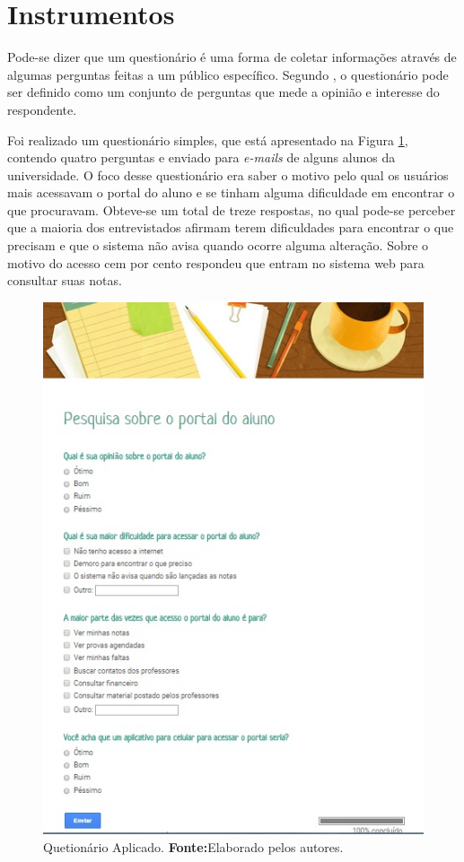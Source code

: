 \section{Instrumentos}

	\par Pode-se dizer que um questionário é uma forma de coletar informações
através de algumas perguntas feitas a um público específico. Segundo
, o questionário pode ser definido como um conjunto
de perguntas que mede a opinião e interesse do respondente.

	\par Foi realizado um questionário simples, que está apresentado na Figura
\ref{fig:qm1}, contendo quatro perguntas e enviado para \textit{e-mails} de
alguns alunos da universidade. O foco desse questionário era saber o motivo pelo qual
os usuários mais acessavam o portal do aluno e se tinham alguma dificuldade em
encontrar o que procuravam. Obteve-se um total de treze respostas, no qual
pode-se perceber que a maioria dos entrevistados afirmam terem dificuldades
para encontrar o que precisam e que o sistema não avisa quando ocorre alguma
alteração. Sobre o motivo do acesso cem por cento respondeu que entram no
sistema web para consultar suas notas.
\pagebreak
\begin{figure}[h!]
	\centerline{\includegraphics[scale=0.5]{./imagens/2_q_metodologico/qm1.png}}
	\caption[Quetionário Aplicado]{Quetionário Aplicado.
		\textbf{Fonte:}Elaborado pelos autores.}
	\label{fig:qm1}
\end{figure}
	

